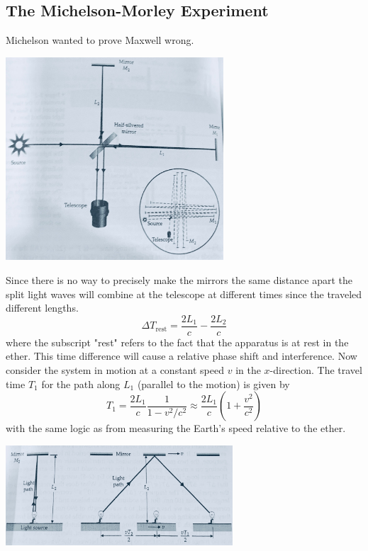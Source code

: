     \subsection*{The Michelson-Morley Experiment}
        Michelson wanted to prove Maxwell wrong.
        \begin{center}
            \includegraphics[width=230pt]{interferometer.jpg}
        \end{center}
        Since there is no way to precisely make the mirrors the same distance apart the split light waves will combine at the telescope at different times since the traveled different lengths. 
        \begin{equation*}
            \Delta T_{\text{rest}} = \frac{2L_1}{c} - \frac{2L_2}{c}
        \end{equation*}
        where the subscript "rest" refers to the fact that the apparatus is at rest in the ether. This time difference will cause a relative phase shift and interference.
        \newline \indent
        Now consider the system in motion at a constant speed $v$ in the $x$-direction. The travel time $T_1$ for the path along $L_1$ (parallel to the motion) is given by
        \begin{equation*}
            T_1 = \frac{2L_1}{c} \frac{1}{1-v^2/c^2} \approx \frac{2L_1}{c} (1 + \frac{v^2}{c^2})
        \end{equation*}
        with the same logic as from measuring the Earth's speed relative to the ether.
        \begin{center}
            \includegraphics[width=240pt]{movinginterferometer.jpg}
        \end{center}
